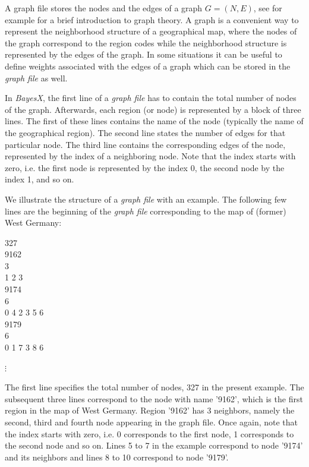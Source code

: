 A graph file stores the nodes and the edges of a graph $G = (N,E)$, see for example  for a brief
introduction to graph theory. A graph is a convenient way to represent the neighborhood structure of a geographical map, where
the nodes of the graph correspond to the region codes while the neighborhood structure is represented by the edges of the
graph. In some situations it can be useful to define weights associated with the edges of a graph which can be stored in the
{\em graph file} as well.

In {\em BayesX}, the first line of a {\em graph file} has to
contain the total number of nodes of the graph. Afterwards, each
region (or node) is represented by a block of three lines. The
first of these lines contains the name of the node (typically the
name of the geographical region). The second line states the
number of edges for that particular node. The third line contains
the corresponding edges of the node, represented by the index of a
neighboring node. Note that the index starts with zero, i.e. the
first node is represented by the index 0, the second node by the
index 1, and so on.

We illustrate the structure of a {\em graph file} with an example. The
following few lines are the beginning
of the {\em graph file} corresponding to the map of (former) West Germany:

\footnotesize

327 \\
9162 \\
3 \\
1 2 3 \\
9174 \\
6 \\
0 4 2 3 5 6 \\
9179 \\
6 \\
0 1 7 3 8 6

\hspace{1cm} $\vdots$

\normalsize

\vspace{0.5cm}

The first line specifies the total number of nodes, 327 in the
present example. The subsequent three lines correspond to the node
with name '9162', which is the first region in the map of West
Germany. Region '9162' has 3 neighbors, namely the second, third
and fourth node appearing in the graph file. Once again, note that
the index starts with zero, i.e. 0 corresponds to the first node,
1 corresponds to the second node and so on. Lines 5 to 7 in the
example correspond to node '9174' and its neighbors and lines 8 to
10 correspond to node '9179'.

